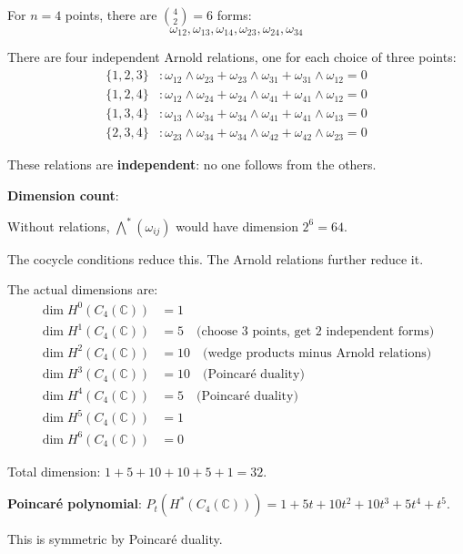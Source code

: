 \begin{example}[$n=4$: Multiple Relations]
\label{ex:arnold-n4-complete}

For $n=4$ points, there are $\binom{4}{2} = 6$ forms:
\begin{equation}
\omega_{12}, \omega_{13}, \omega_{14}, \omega_{23}, \omega_{24}, \omega_{34}
\end{equation}

There are four independent Arnold relations, one for each choice of three points:
\begin{align}
\{1,2,3\}&: \omega_{12} \wedge \omega_{23} + \omega_{23} \wedge \omega_{31} + 
\omega_{31} \wedge \omega_{12} = 0\\
\{1,2,4\}&: \omega_{12} \wedge \omega_{24} + \omega_{24} \wedge \omega_{41} + 
\omega_{41} \wedge \omega_{12} = 0\\
\{1,3,4\}&: \omega_{13} \wedge \omega_{34} + \omega_{34} \wedge \omega_{41} + 
\omega_{41} \wedge \omega_{13} = 0\\
\{2,3,4\}&: \omega_{23} \wedge \omega_{34} + \omega_{34} \wedge \omega_{42} + 
\omega_{42} \wedge \omega_{23} = 0
\end{align}

These relations are \textbf{independent}: no one follows from the others.

\textbf{Dimension count}:

Without relations, $\bigwedge^*(\omega_{ij})$ would have dimension $2^6 = 64$.

The cocycle conditions reduce this. The Arnold relations further reduce it.

The actual dimensions are:
\begin{align}
\dim H^0(C_4(\mathbb{C})) &= 1\\
\dim H^1(C_4(\mathbb{C})) &= 5 \quad \text{(choose 3 points, get 2 independent forms)}\\
\dim H^2(C_4(\mathbb{C})) &= 10 \quad \text{(wedge products minus Arnold relations)}\\
\dim H^3(C_4(\mathbb{C})) &= 10 \quad \text{(Poincaré duality)}\\
\dim H^4(C_4(\mathbb{C})) &= 5 \quad \text{(Poincaré duality)}\\
\dim H^5(C_4(\mathbb{C})) &= 1\\
\dim H^6(C_4(\mathbb{C})) &= 0
\end{align}

Total dimension: $1 + 5 + 10 + 10 + 5 + 1 = 32$.

\textbf{Poincaré polynomial}: $P_t(H^*(C_4(\mathbb{C}))) = 1 + 5t + 10t^2 + 10t^3 + 
5t^4 + t^5$.

This is symmetric by Poincaré duality.
\end{example}


